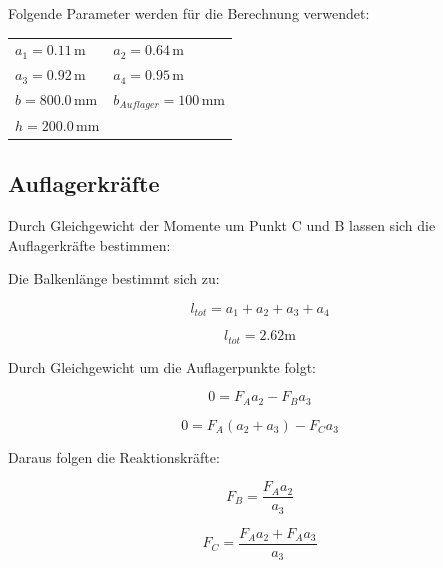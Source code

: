 \documentclass[
  12pt,
  letterpaper,
  egregdoesnotlikesansseriftitles]{scrreprt}
\begin{document}
Folgende Parameter werden für die Berechnung verwendet:

\begin{longtable}[]{@{}
  >{\raggedright\arraybackslash}p{}
  >{\raggedright\arraybackslash}p{}@{}}
\toprule\noalign{}
\endhead
\bottomrule\noalign{}
\endlastfoot
\(a_{1} = 0.11 \, \text{m}\) & \(a_{2} = 0.64 \, \text{m}\) \\
\(a_{3} = 0.92 \, \text{m}\) & \(a_{4} = 0.95 \, \text{m}\) \\
\(b = 800.0 \, \text{mm}\) & \(b_{Auflager} = 100 \, \text{mm}\) \\
\(h = 200.0 \, \text{mm}\) & \\
\end{longtable}

\hypertarget{auflagerkruxe4fte}{%
\subsection{Auflagerkräfte}\label{auflagerkruxe4fte}}

Durch Gleichgewicht der Momente um Punkt C und B lassen sich die
Auflagerkräfte bestimmen:

Die Balkenlänge bestimmt sich zu:

\begin{equation}l_{tot} = a_{1} + a_{2} + a_{3} + a_{4}\end{equation}

\begin{equation}l_{tot} = 2.62 \text{m}\end{equation}

Durch Gleichgewicht um die Auflagerpunkte folgt:

\begin{equation}0 = F_{A} a_{2} - F_{B} a_{3}\end{equation}

\begin{equation}0 = F_{A} \left(a_{2} + a_{3}\right) - F_{C} a_{3}\end{equation}

Daraus folgen die Reaktionskräfte:

\begin{equation}F_{B} = \frac{F_{A} a_{2}}{a_{3}}\end{equation}

\begin{equation}F_{C} = \frac{F_{A} a_{2} + F_{A} a_{3}}{a_{3}}\end{equation}
\end{document}
